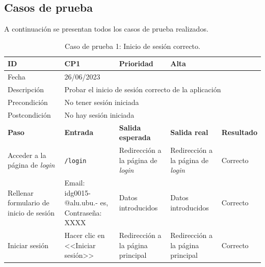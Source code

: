 \subsection{Casos de prueba}
A continuación se presentan todos los casos de prueba realizados.

\begin{table}[H]
\begin{tabular}{p{} p{} p{} p{} p{}}
\cellcolor{gray!25}
ID   & CP1 & \cellcolor{gray!25} Prioridad   & Alta \\ \hline
\cellcolor{gray!25} Fecha	&	\multicolumn{4}{l}{26/06/2023} \\ \hline
\cellcolor{gray!25} Descripción		&	\multicolumn{4}{l}{Probar el inicio de sesión correcto de la aplicación} \\ \hline                                            
\cellcolor{gray!25}
Precondición  & \multicolumn{4}{l}{No tener sesión iniciada} \\ \hline
\cellcolor{gray!25} Postcondición & \multicolumn{4}{l}{No hay sesión iniciada}                                                                                                      \\ \hline
\rowcolor{gray!25}
\textbf{Paso}   & \textbf{Entrada} & \textbf{Salida esperada} & \textbf{Salida real} & \textbf{Resultado} \\ \hline
Acceder a la página de \textit{login} 
& \texttt{/login}                                                                             
& Redirección a la página de \textit{login}                                    
& Redirección a la página de \textit{login}                                   
& Correcto                            
\\ \hline
Rellenar formulario de inicio de sesión
& Email: idg0015-
@alu.ubu.-
es, Contraseña: XXXX                                                                                                        
& Datos introducidos                               
& Datos introducidos                                
& Correcto                            
\\ \hline
Iniciar sesión
& Hacer clic en <<Iniciar sesión>>
& Redirección a la página principal                                 
& Redirección a la página principal                                 
& Correcto                            
\\ \hline                 
\end{tabular}
\caption{Caso de prueba 1: Inicio de sesión correcto.}
\end{table}

